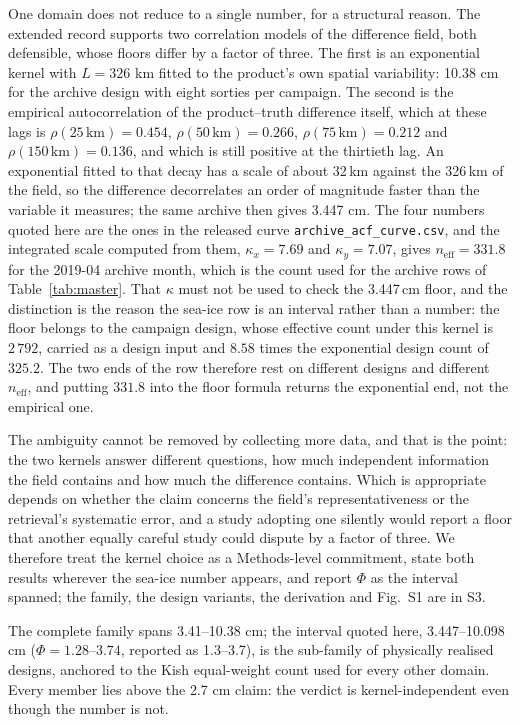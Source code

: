 \documentclass[preprint,12pt,authoryear]{elsarticle}
\begin{document}
One domain does not reduce to a single number, for a structural reason. The extended record supports two correlation models of the difference field, both defensible, whose floors differ by a factor of three. The first is an exponential kernel with $L = 326$ km fitted to the product's own spatial variability: 10.38 cm for the archive design with eight sorties per campaign. The second is the empirical autocorrelation of the product--truth difference itself, which at these lags is $\rho(25\,\mathrm{km}) = 0.454$, $\rho(50\,\mathrm{km}) = 0.266$, $\rho(75\,\mathrm{km}) = 0.212$ and $\rho(150\,\mathrm{km}) = 0.136$, and which is still positive at the thirtieth lag. An exponential fitted to that decay has a scale of about 32\,km against the 326\,km of the field, so the difference decorrelates an order of magnitude faster than the variable it measures; the same archive then gives 3.447 cm. The four numbers quoted here are the ones in the released curve \texttt{archive\_acf\_curve.csv}, and the integrated scale computed from them, $\kappa_x = 7.69$ and $\kappa_y = 7.07$, gives $n_{\mathrm{eff}} = 331.8$ for the 2019-04 archive month, which is the count used for the archive rows of Table~\ref{tab:master}. That $\kappa$ must not be used to check the 3.447\,cm floor, and the distinction is the reason the sea-ice row is an interval rather than a number: the floor belongs to the campaign design, whose effective count under this kernel is $2\,792$, carried as a design input and $8.58$ times the exponential design count of $325.2$. The two ends of the row therefore rest on different designs and different $n_{\mathrm{eff}}$, and putting $331.8$ into the floor formula returns the exponential end, not the empirical one.

The ambiguity cannot be removed by collecting more data, and that is the point: the two kernels answer different questions, how much independent information the field contains and how much the difference contains. Which is appropriate depends on whether the claim concerns the field's representativeness or the retrieval's systematic error, and a study adopting one silently would report a floor that another equally careful study could dispute by a factor of three. We therefore treat the kernel choice as a Methods-level commitment, state both results wherever the sea-ice number appears, and report $\Phi$ as the interval spanned; the family, the design variants, the derivation and Fig.~S1 are in S3.

The complete family spans 3.41--10.38 cm; the interval quoted here, 3.447--10.098 cm ($\Phi = 1.28$--$3.74$, reported as 1.3--3.7), is the sub-family of physically realised designs, anchored to the Kish equal-weight count used for every other domain. Every member lies above the 2.7 cm claim: the verdict is kernel-independent even though the number is not.
\end{document}
